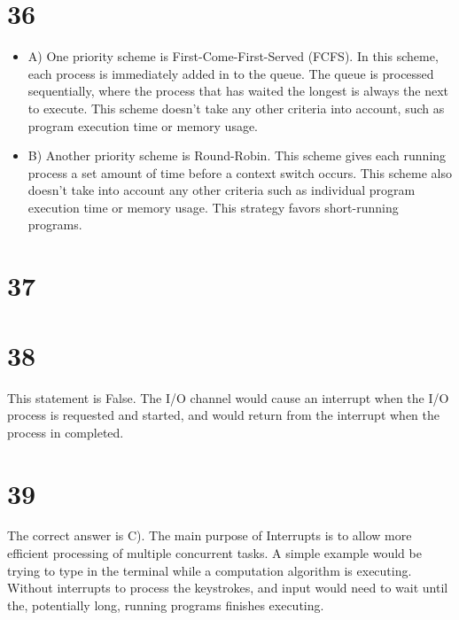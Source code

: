 \documentclass[a4paper,11pt]{article}
\begin{document}
\section*{36}
\begin{itemize}
  \item A) One priority scheme is First-Come-First-Served (FCFS).  In this scheme, each process is immediately added in to the queue.  The queue is processed sequentially, where the process that has waited the longest is always the next to execute.  This scheme doesn't take any other criteria into account, such as program execution time or memory usage.
  \item B) Another priority scheme is Round-Robin.  This scheme gives each running process a set amount of time before a context switch occurs.  This scheme also doesn't take into account any other criteria such as individual program execution time or memory usage.  This strategy favors short-running programs.
\end{itemize}


\section*{37}


\section*{38}
This statement is False.  The I/O channel would cause an interrupt when the I/O process is requested and started, and would return from the interrupt when the process in completed.


\section*{39}
The correct answer is C).   The main purpose of Interrupts is to allow more efficient processing of multiple concurrent tasks.  A simple example would be trying to type in the terminal while a computation algorithm is executing.  Without interrupts to process the keystrokes, and input would need to wait until the, potentially long, running programs finishes executing. 

\end{document}

